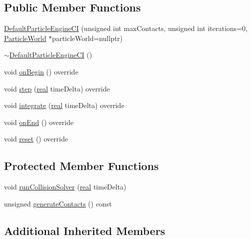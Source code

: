 \subsection*{Public Member Functions}
\begin{DoxyCompactItemize}
\item 
\mbox{\hyperlink{classr3_1_1_default_particle_engine_c_i_a58fd25bfac329775ac6031a07bd64fbb}{Default\+Particle\+Engine\+CI}} (unsigned int max\+Contacts, unsigned int iterations=0, \mbox{\hyperlink{classr3_1_1_particle_world}{Particle\+World}} $\ast$particle\+World=nullptr)
\item 
\mbox{\hyperlink{classr3_1_1_default_particle_engine_c_i_afb7df43eb7fe45d6bcb15c39e3c30849}{$\sim$\+Default\+Particle\+Engine\+CI}} ()
\item 
void \mbox{\hyperlink{classr3_1_1_default_particle_engine_c_i_aaf2e9ca87bff5e48c8eb59384e9cf180}{on\+Begin}} () override
\item 
void \mbox{\hyperlink{classr3_1_1_default_particle_engine_c_i_a7c58fd00ec521410e1b412e9885ee0d2}{step}} (\mbox{\hyperlink{namespacer3_ab2016b3e3f743fb735afce242f0dc1eb}{real}} time\+Delta) override
\item 
void \mbox{\hyperlink{classr3_1_1_default_particle_engine_c_i_a4603707afe6c841a83294a46ea4a1c62}{integrate}} (\mbox{\hyperlink{namespacer3_ab2016b3e3f743fb735afce242f0dc1eb}{real}} time\+Delta) override
\item 
void \mbox{\hyperlink{classr3_1_1_default_particle_engine_c_i_a6a34c77436d8133560eaa7366c740119}{on\+End}} () override
\item 
void \mbox{\hyperlink{classr3_1_1_default_particle_engine_c_i_a97757c62b4cb1266da29e2b5625bb9d3}{reset}} () override
\end{DoxyCompactItemize}
\subsection*{Protected Member Functions}
\begin{DoxyCompactItemize}
\item 
void \mbox{\hyperlink{classr3_1_1_default_particle_engine_c_i_a19138f7707e948b7e8e05647bcba52fe}{run\+Collision\+Solver}} (\mbox{\hyperlink{namespacer3_ab2016b3e3f743fb735afce242f0dc1eb}{real}} time\+Delta)
\item 
unsigned \mbox{\hyperlink{classr3_1_1_default_particle_engine_c_i_a84b1d2f9a9c1656d633de4f1bc254020}{generate\+Contacts}} () const
\end{DoxyCompactItemize}
\subsection*{Additional Inherited Members}


